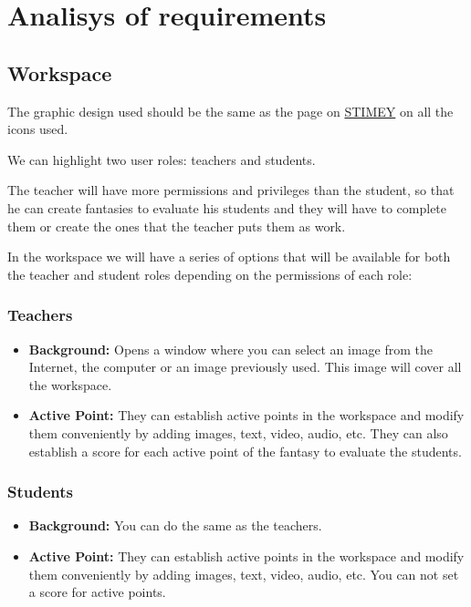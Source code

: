 \chapter{Analisys of requirements}
\section{Workspace}
The graphic design used should be the same as the page on \href{https://stimey.eu/home}{STIMEY} on all the icons used.

We can highlight two user roles: teachers and students.

The teacher will have more permissions and privileges than the student, so that he can create fantasies to evaluate his students and they will have to complete them or create the ones that the teacher puts them as work.

In the workspace we will have a series of options that will be available for both the teacher and student roles depending on the permissions of each role:

\subsection{Teachers}
\begin{itemize}
	\item \textbf{Background:} Opens a window where you can select an image from the Internet, the computer or an image previously used. This image will cover all the workspace.
	\item \textbf{Active Point:} They can establish active points in the workspace and modify them conveniently by adding images, text, video, audio, etc. They can also establish a score for each active point of the fantasy to evaluate the students.
\end{itemize}

\subsection{Students}
\begin{itemize}
	\item \textbf{Background:} You can do the same as the teachers.
	\item \textbf{Active Point:} They can establish active points in the workspace and modify them conveniently by adding images, text, video, audio, etc. You can not set a score for active points.
\end{itemize}

